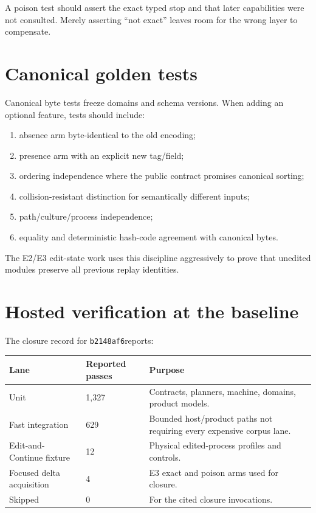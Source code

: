 \documentclass[11pt,oneside,openany]{book}
\newcommand{\shortcommit}{\texttt{b2148af6}}
\begin{document}
A poison test should assert the exact typed stop and that later capabilities were not consulted. Merely asserting ``not exact'' leaves room for the wrong layer to compensate.

\section{Canonical golden tests}

Canonical byte tests freeze domains and schema versions. When adding an optional feature, tests should include:

\begin{enumerate}
  \item absence arm byte-identical to the old encoding;
  \item presence arm with an explicit new tag/field;
  \item ordering independence where the public contract promises canonical sorting;
  \item collision-resistant distinction for semantically different inputs;
  \item path/culture/process independence;
  \item equality and deterministic hash-code agreement with canonical bytes.
\end{enumerate}

The E2/E3 edit-state work uses this discipline aggressively to prove that unedited modules preserve all previous replay identities.

\section{Hosted verification at the baseline}

The closure record for \shortcommit reports:

\begin{center}
\begin{tabular}{L{60mm}R{27mm}L{58mm}}
\toprule
\textbf{Lane} & \textbf{Reported passes} & \textbf{Purpose} \\
\midrule
Unit & 1,327 & Contracts, planners, machine, domains, product models. \\
Fast integration & 629 & Bounded host/product paths not requiring every expensive corpus lane. \\
Edit-and-Continue fixture & 12 & Physical edited-process profiles and controls. \\
Focused delta acquisition & 4 & E3 exact and poison arms used for closure. \\
Skipped & 0 & For the cited closure invocations. \\
\bottomrule
\end{tabular}
\end{center}
\end{document}

